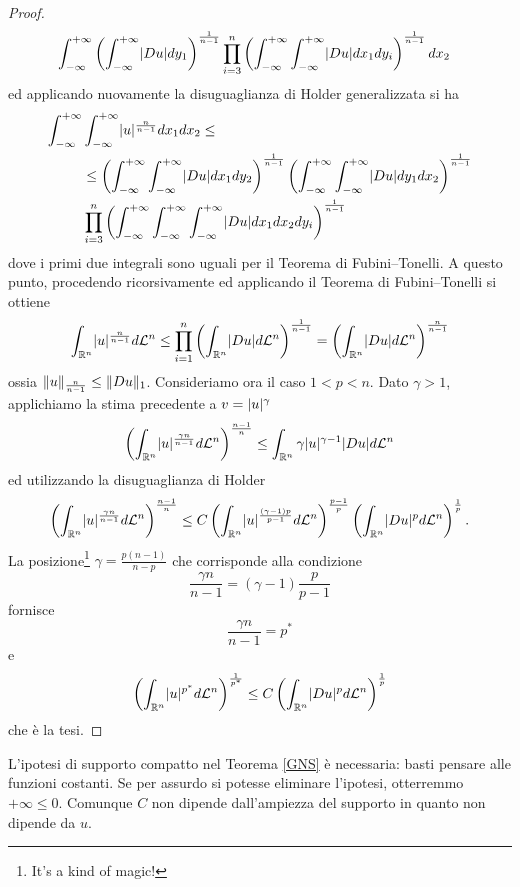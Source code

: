 \begin{proof}
\begin{align*}
		&\int_{-\infty}^{+\infty} \left( \int_{-\infty}^{+\infty}\lvert Du\rvert dy_1\right)^{\frac{1}{n-1}}  \prod_{i=3}^{n} \left( \int_{-\infty}^{+\infty}\int_{-\infty}^{+\infty}\lvert Du\rvert dx_1 dy_i\right) ^{\frac{1}{n-1}} dx_2
	\end{align*}
	ed applicando nuovamente la disuguaglianza di Holder generalizzata si ha
	\begin{align*}
		\int_{-\infty}^{+\infty}&\int_{-\infty}^{+\infty} \lvert u\rvert^{\frac{n}{n-1}}dx_1 dx_2 \le \\
		&\le \left( \int_{-\infty}^{+\infty}\int_{-\infty}^{+\infty}\lvert Du\rvert dx_1dy_2\right) ^{\frac{1}{n-1}}\left( \int_{-\infty}^{+\infty}\int_{-\infty}^{+\infty}\lvert Du\rvert dy_1dx_2\right) ^{\frac{1}{n-1}} \\
		& \prod_{i=3}^{n} \left(\int_{-\infty}^{+\infty} \int_{-\infty}^{+\infty}\int_{-\infty}^{+\infty}\lvert Du\rvert dx_1dx_2 dy_i\right) ^{\frac{1}{n-1}}
	\end{align*}
	dove i primi due integrali sono uguali per il Teorema di Fubini--Tonelli. A questo punto, procedendo ricorsivamente ed applicando il Teorema di Fubini--Tonelli si ottiene
	\[ 	\int_{\mathbb{R}^n}\lvert u\rvert^{\frac{n}{n-1}}d\mathcal{L}^n \le \prod_{i=1}^n \left( \int_{\mathbb{R}^n} \lvert Du\rvert d\mathcal{L}^n\right) ^{\frac{1}{n-1}} = \left( \int_{\mathbb{R}^n} \lvert Du\rvert d\mathcal{L}^n\right) ^{\frac{n}{n-1}} \]
	ossia $\lVert u\rVert_{\frac{n}{n-1}} \le \lVert Du\rVert_1$. Consideriamo ora il caso $1 < p < n$. Dato $\gamma > 1$, applichiamo la stima precedente a $v = \lvert u\rvert^\gamma$
	\[ \left(	\int_{\mathbb{R}^n}\lvert u\rvert^{\frac{\gamma n}{n-1}}d\mathcal{L}^n\right) ^{\frac{n-1}{n}} \le \int_{\mathbb{R}^n} \gamma \lvert u\rvert^{\gamma -1}\lvert Du\rvert d\mathcal{L}^n \]
	ed utilizzando la disuguaglianza di Holder
	\[ \left(\int_{\mathbb{R}^n}\lvert u\rvert^{\frac{\gamma n}{n-1}}d\mathcal{L}^n\right) ^{\frac{n-1}{n}} \le C \left( \int_{\mathbb{R}^n} \lvert u\rvert^{\frac{(\gamma -1)p}{p-1}}d\mathcal{L}^n\right) ^{\frac{p-1}{p}} \left(\int_{\mathbb{R}^n} \lvert Du\rvert^p d\mathcal{L}^n\right) ^{\frac{1}{p}}.  \]
	La posizione\footnote{It's a kind of magic!} $ \gamma = \frac{p(n-1)}{n-p} $ che corrisponde alla condizione
	\[ \frac{\gamma n}{n-1} = \left( \gamma -1\right) \frac{p}{p-1} \]
	fornisce 
	\[ \frac{\gamma n}{n-1} = p^{\ast} \]
	e 
	\[ \left(\int_{\mathbb{R}^n}\lvert u\rvert^{p^{\ast}}d\mathcal{L}^n\right) ^{\frac{1}{p^{\ast}}} \le C \left(\int_{\mathbb{R}^n} \lvert Du\rvert^p d\mathcal{L}^n\right) ^{\frac{1}{p}} \]
	che è la tesi.
\end{proof}
\begin{osservazione}
	L'ipotesi di supporto compatto nel Teorema \eqref{GNS} è necessaria: basti pensare alle funzioni costanti. Se per assurdo si potesse eliminare l'ipotesi, otterremmo $+\infty \le 0$. Comunque $C$ non dipende dall'ampiezza del supporto in quanto non dipende da $u$.
\end{osservazione}
